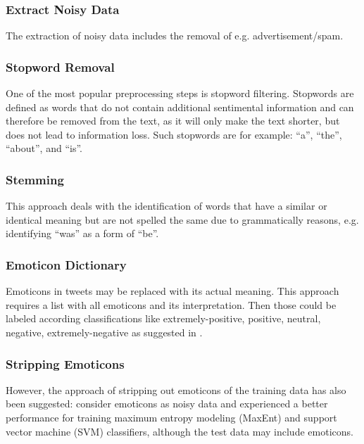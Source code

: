 \documentclass{acm_proc_article-sp}
\begin{document}
\subsubsection{Extract Noisy Data}

The extraction of noisy data includes
the removal of e.g. advertisement/spam.

\subsubsection{Stopword Removal}

One of the most popular preprocessing steps is
stopword filtering. Stopwords are defined as words that do not contain
additional sentimental information and can therefore be removed from the text,
as it will only make the text shorter, but does not lead to information loss.
Such stopwords are for example: ``a'', ``the'', ``about'', and ``is''.

\subsubsection{Stemming}

This approach deals with the identification of words
that have a similar or identical meaning but are not spelled the same due to
grammatically reasons, e.g. identifying ``was'' as a form of ``be''.

\subsubsection{Emoticon Dictionary}

Emoticons in tweets may be replaced with
its actual meaning. This approach requires a list with all emoticons and its
interpretation. Then those could be labeled according classifications like
extremely-positive, positive, neutral, negative, extremely-negative as
suggested in \cite{agarwal2011sentiment}.

\subsubsection{Stripping Emoticons}

However, the approach of stripping out
emoticons of the training data has also been suggested: \cite{go2009twitter}
consider emoticons as noisy data and experienced a better performance for
training maximum entropy modeling (MaxEnt) and support vector machine (SVM)
classifiers, although the test data may include emoticons.
\end{document}
